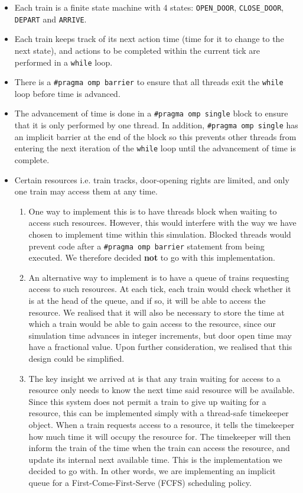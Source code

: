 \documentclass[a4paper,12pt]{article}
\begin{document}
\begin{itemize}
\begin{itemize}
    \end{itemize}
	\item Each train is a finite state machine with 4 states: \texttt{OPEN\_DOOR}, \texttt{CLOSE\_DOOR}, \texttt{DEPART} and \texttt{ARRIVE}.
	\item Each train keeps track of its next action time (time for it to change to the next state), and actions to be completed within the current tick are performed in a \texttt{while} loop.
	\item There is a \texttt{#pragma omp barrier} to ensure that all threads exit the \texttt{while} loop before time is advanced.
	\item The advancement of time is done in a \texttt{#pragma omp single} block to ensure that it is only performed by one thread. In addition, \texttt{#pragma omp single} has an implicit barrier at the end of the block so this prevents other threads from entering the next iteration of the \texttt{while} loop until the advancement of time is complete.
	\item Certain resources i.e. train tracks, door-opening rights are limited, and only one train may access them at any time.
	      \begin{enumerate}
		      \item One way to implement this is to have threads block when waiting to access such resources. However, this would interfere with the way we have chosen to implement time within this simulation. Blocked threads would prevent code after a \texttt{#pragma omp barrier} statement from being executed. We therefore decided \textbf{not} to go with this implementation.
		      \item An alternative way to implement is to have a queue of trains requesting access to such resources. At each tick, each train would check whether it is at the head of the queue, and if so, it will be able to access the resource. We realised that it will also be necessary to store the time at which a train would be able to gain access to the resource, since our simulation time advances in integer increments, but door open time may have a fractional value. Upon further consideration, we realised that this design could be simplified.
		      \item The key insight we arrived at is that any train waiting for access to a resource only needs to know the next time said resource will be available. Since this system does not permit a train to give up waiting for a resource, this can be implemented simply with a thread-safe timekeeper object. When a train requests access to a resource, it tells the timekeeper how much time it will occupy the resource for. The timekeeper will then inform the train of the time when the train can access the resource, and update its internal next available time. This is the implementation we decided to go with. In other words, we are implementing an implicit queue for a First-Come-First-Serve (FCFS) scheduling policy.

\end{enumerate}
\end{itemize}
\end{document}
